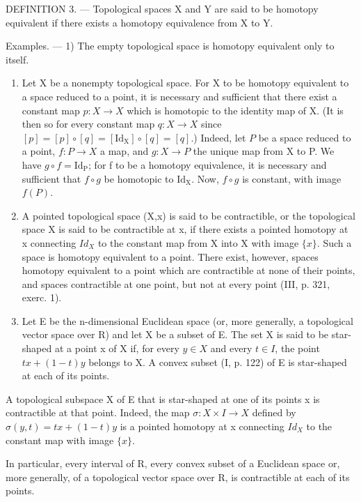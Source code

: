 DEFINITION 3. --- Topological spaces X and Y are said to be homotopy equivalent if there exists a homotopy equivalence from X to Y.

Examples. --- 1) The empty topological space is homotopy equivalent only to itself.

\begin{enumerate}
\def\labelenumi{\arabic{enumi})}
\setcounter{enumi}{1}
\item
  Let X be a nonempty topological space. For X to be homotopy equivalent to a space reduced to a point, it is necessary and sufficient that there exist a constant map \(p: X \rightarrow X\) which is homotopic to the identity map of X. (It is then so for every constant map \(q \colon X \to X\) since \([p] = [p] \circ [q] = [\mathrm{Id}_{\mathrm{X}}] \circ [q] = [q]\).) Indeed, let \(P\) be a space reduced to a point, \(f \colon P \to X\) a map, and \(g \colon X \to P\) the unique map from X to P. We have \(g \circ f = \mathrm{Id}_{\mathrm{P}}\); for f to be a homotopy equivalence, it is necessary and sufficient that \(f \circ g\) be homotopic to \(\mathrm{Id}_{\mathrm{X}}\). Now, \(f \circ g\) is constant, with image \(f(P)\).
\item
  A pointed topological space (X,x) is said to be contractible, or the topological space X is said to be contractible at x, if there exists a pointed homotopy at x connecting \(Id_{X}\) to the constant map from X into X with image \(\{x\}\). Such a space is homotopy equivalent to a point. There exist, however, spaces homotopy equivalent to a point which are contractible at none of their points, and spaces contractible at one point, but not at every point (III, p. 321, exerc. 1).
\item
  Let E be the n-dimensional Euclidean space (or, more generally, a topological vector space over R) and let X be a subset of E. The set X is said to be star-shaped at a point x of X if, for every \(y \in X\) and every \(t \in I\), the point \(tx + (1 - t)y\) belongs to X. A convex subset (I, p. 122) of E is star-shaped at each of its points.
\end{enumerate}

A topological subspace X of E that is star-shaped at one of its points x is contractible at that point. Indeed, the map \(\sigma\colon X \times I \to X\) defined by \(\sigma(y,t) = tx + (1 - t)y\) is a pointed homotopy at x connecting \(Id_{X}\) to the constant map with image \(\{x\}\).

In particular, every interval of R, every convex subset of a Euclidean space or, more generally, of a topological vector space over R, is contractible at each of its points.

